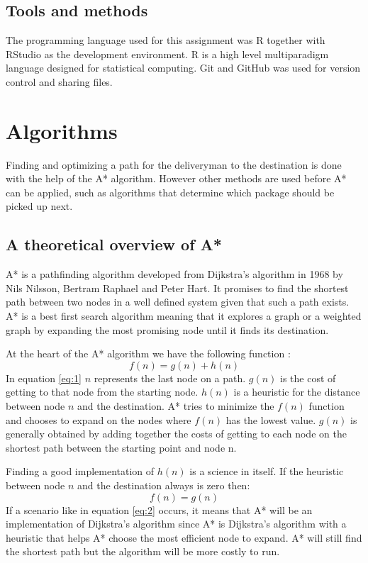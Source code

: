 \documentclass[12pt, a4paper]{article}
\begin{document}
\subsection{Tools and methods}

The programming language used for this assignment was R together with RStudio as the development environment. R is a high level multiparadigm language designed for statistical computing\cite{rLang}. Git and GitHub was used for version control and sharing files. 


\section{Algorithms}

Finding and optimizing a path for the deliveryman to the destination is done with the help of the A* algorithm. However other methods are used before A* can be applied, such as algorithms that determine which package should be picked up next.

\subsection{A theoretical overview of A*}

A* is a pathfinding algorithm developed from Dijkstra’s algorithm in 1968 by Nils Nilsson, Bertram Raphael and Peter Hart\cite{nils}. It promises to find the shortest path between two nodes in a well defined system given that such a path exists. A* is a best first search algorithm meaning that it explores a graph or a weighted graph by expanding the most promising node until it finds its destination\cite{amit}\cite{aStar}.

At the heart of the A* algorithm we have the following function :
\begin{equation} \label{eq:1}
f(n) = g(n) + h(n)
\end{equation}
In equation \ref{eq:1} $n$ represents the last node on a path. $g(n)$ is the cost of getting to that node from the starting node. $h(n)$ is a heuristic for the distance between node $n$ and the destination. A* tries to minimize the $f(n)$ function and chooses to expand on the nodes where $f(n)$ has the lowest value. $g(n)$ is generally obtained by adding together the costs of getting to each node on the shortest path between the starting point and node n\cite{amit}\cite{aStar}.

Finding a good implementation of $h(n)$ is a science in itself. If the heuristic between node $n$ and the destination always is zero then:
\begin{equation} \label{eq:2}
f(n) = g(n)
\end{equation}
If a scenario like in equation \ref{eq:2} occurs, it means that A* will be an implementation of Dijkstra’s algorithm since A* is Dijkstra’s algorithm with a heuristic that helps A* choose the most efficient node to expand. A* will still find the shortest path but the algorithm will be more costly to run\cite{amit}.
\end{document}
